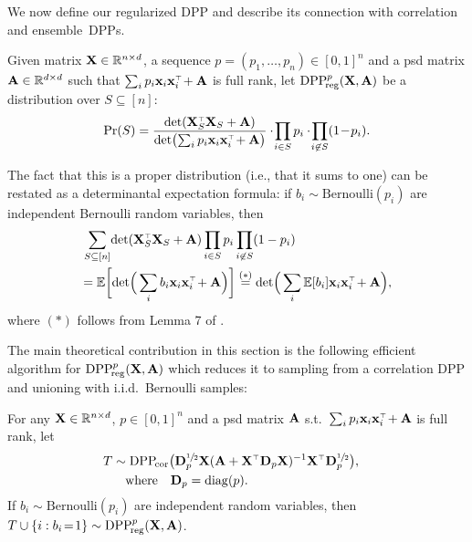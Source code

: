 \documentclass[thesis.tex]{subfiles}
\begin{document}
We now define our regularized DPP and describe its
connection with correlation and ensemble~DPPs.
\begin{definition}\label{d:r-dpp}
Given matrix $\mathbf X\in\mathbb R^{n\times d}$, a sequence  $p=(p_1,\dots,p_n)\in[0,1]^n$
and a psd matrix $\mathbf A\in\mathbb R^{d\times d}$ such that
$\sum_ip_i\x_i\x_i^\top\!+\A$ is
full rank, let
${{\mathrm{DPP}}_{\!\mathrm{reg}}^{p}}(\mathbf X,\mathbf A)$ be a distribution over $S\subseteq [n]$:
  \begin{align}
  \Pr(S) = \frac{\det(
  \X_S^\top\X_S+\A)}{\det\!\big(\!
 \sum_ip_i\x_i\x_i^\top\!+ \A\big)}
\cdot \!\prod_{i\in S}p_{i}\cdot\!\prod_{i\not\in S}(1\!-\!p_i).\label{eq:poisson-prob}
\end{align}
\end{definition}
The fact that this is a proper distribution (i.e., that it sums to
one) can be restated as a determinantal expectation formula: if
$b_i\sim\mathrm{Bernoulli}(p_i)$ are independent Bernoulli random
variables, then
\begin{align*}
  &\sum_{S\subseteq [n]}\!\det(
  \X_S^\top\X_S+\A)\prod_{i\in S}p_{i}\prod_{i\not\in S}(1-p_i) \\
  &\!=
  \E\bigg[\!\det\!\Big(\sum_ib_i\x_i\x_i^\top\!+\A\Big)\bigg]\overset{(*)}{=}
  \det\!\Big(\sum_i\E[b_i]\x_i\x_i^\top\!+\A\Big),
\end{align*}
where $(*)$ follows  from Lemma 7 of \citet{determinantal-averaging}.

  The main theoretical contribution in this section is the
  following efficient algorithm for ${{\mathrm{DPP}}_{\!\mathrm{reg}}^{p}}(\mathbf X,\mathbf A)$ which reduces it to
  sampling from a correlation DPP and unioning with i.i.d.~Bernoulli samples:
\begin{theorem}\label{t:algorithm}
For any $\mathbf X\in\mathbb R^{n\times d}$, $p\in[0,1]^n$ and a psd matrix $\mathbf A$
s.t.~$\sum_ip_i\x_i\x_i^\top\!+\A$ is
full rank, let
\begin{align*}
  T&\sim\DPPcor\big(\D_p^{\sfrac12}\X(\A+\X^\top\D_p\X)^{-1}\X^\top\D_p^{\sfrac12}\big),
  \quad\\
  &\quad\text{where}\quad\D_p=\diag(p).
\end{align*}
If $b_i\sim\mathrm{Bernoulli}(p_i)$ are independent random variables, then
$T\cup \{i:b_i\!=\!1\}\sim {{\mathrm{DPP}}_{\!\mathrm{reg}}^{p}}(\mathbf X,\mathbf A)$.
\end{theorem}
\end{document}
